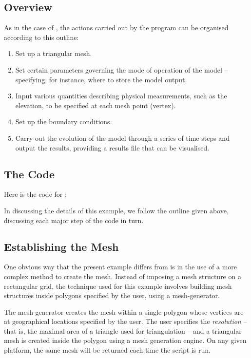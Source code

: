 \documentclass{manual}
\begin{document}
\subsection{Overview}
As in the case of , the actions carried
out by the program can be organised according to this outline:
\begin{enumerate}
   \item Set up a triangular mesh.

   \item Set certain parameters governing the mode of
         operation of the model -- specifying, for instance, where to store the
         model output.

   \item Input various quantities describing physical measurements, such
         as the elevation, to be specified at each mesh point (vertex).

   \item Set up the boundary conditions.

   \item Carry out the evolution of the model through a series of time
         steps and output the results, providing a results file that can be
         visualised.
\end{enumerate}

\subsection{The Code}

Here is the code for :



In discussing the details of this example, we follow the outline
given above, discussing each major step of the code in turn.

\subsection{Establishing the Mesh}

One obvious way that the present example differs from
 is in the use of a more complex method to
create the mesh. Instead of imposing a mesh structure on a
rectangular grid, the technique used for this example involves
building mesh structures inside polygons specified by the user,
using a mesh-generator.

The mesh-generator creates the mesh within a single
polygon whose vertices are at geographical locations specified by
the user. The user specifies the \emph{resolution} -- that is, the
maximal area of a triangle used for triangulation -- and a triangular
mesh is created inside the polygon using a mesh generation engine.
On any given platform, the same mesh will be returned each time the
script is run.
\end{document}
